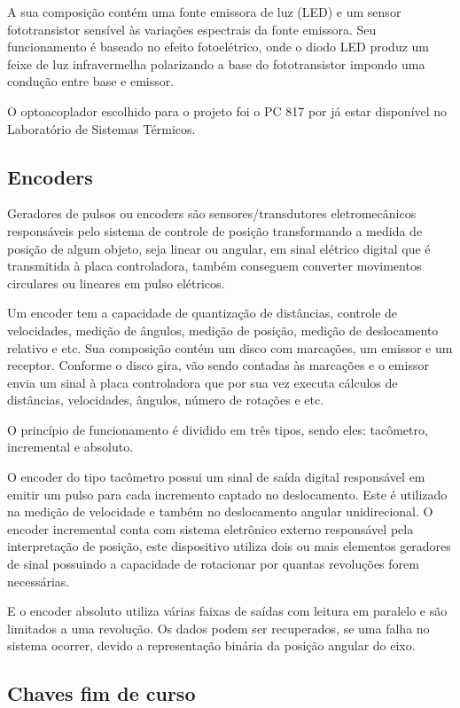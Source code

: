 A sua composição contém uma fonte emissora de luz (LED) e um sensor fototransistor sensível às variações 
espectrais da fonte emissora. Seu funcionamento é baseado no efeito fotoelétrico, onde o diodo LED produz 
um feixe de luz infravermelha polarizando a base do fototransistor impondo uma condução entre base e emissor.

O optoacoplador escolhido para o projeto foi o PC 817 por já estar disponível no Laboratório de Sistemas 
Térmicos.

\subsection{Encoders}

Geradores de pulsos ou encoders são sensores/transdutores eletromecânicos responsáveis pelo sistema de 
controle de posição transformando a medida de posição de algum objeto, seja linear ou angular, em sinal 
elétrico digital que é transmitida à placa controladora, também conseguem converter movimentos circulares 
ou lineares em pulso elétricos.

Um encoder tem a capacidade de quantização de distâncias, controle de velocidades, medição de ângulos, 
medição de posição, medição de deslocamento relativo e etc. Sua composição contém um disco com marcações, 
um emissor e um receptor. Conforme o disco gira, vão sendo contadas às marcações e o emissor envia um sinal 
à placa controladora que por sua vez executa cálculos de distâncias, velocidades, ângulos, número de rotações 
e etc.

O princípio de funcionamento é dividido em três tipos, sendo eles: tacômetro, incremental e absoluto.

O encoder do tipo tacômetro possui um sinal de saída digital responsável em emitir um pulso para cada 
incremento captado no deslocamento. Este é utilizado na medição de velocidade e também no deslocamento 
angular unidirecional. O encoder incremental conta com sistema eletrônico externo responsável pela 
interpretação de posição, este dispositivo utiliza dois ou mais elementos geradores de sinal possuindo 
a capacidade de rotacionar por quantas revoluções forem necessárias.

E o encoder absoluto utiliza várias faixas de saídas com leitura em paralelo e são limitados a uma revolução. 
Os dados podem ser recuperados, se uma falha no sistema ocorrer, devido a representação binária da posição 
angular do eixo.

\subsection{Chaves fim de curso}


